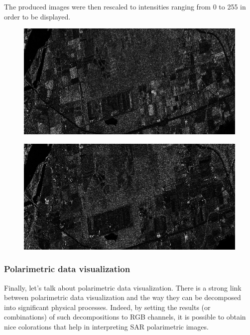 The produced images were then rescaled to intensities ranging from 0 to 255 in order to be displayed.


\begin{center}
  \begin{figure}[h!]
    \includegraphics[width=\textwidth]{../Art/test-left-co-2.png}
    \label{fig:polsynthll}
   \end{figure}
   
   \begin{figure}[h!]
    \includegraphics[width=\textwidth]{../Art/test-left-cross-2.png}
    \label{fig:polsynthlr}
   \end{figure}
\end{center}


\subsubsection{Polarimetric data visualization}

Finally, let's talk about polarimetric data visualization. There is a strong link between polarimetric data visualization and the way they can be decomposed into significant physical processes.
Indeed, by setting the results (or combinations) of such decompositions to RGB channels, it is possible to obtain nice colorations that help in interpreting SAR polarimetric images.

